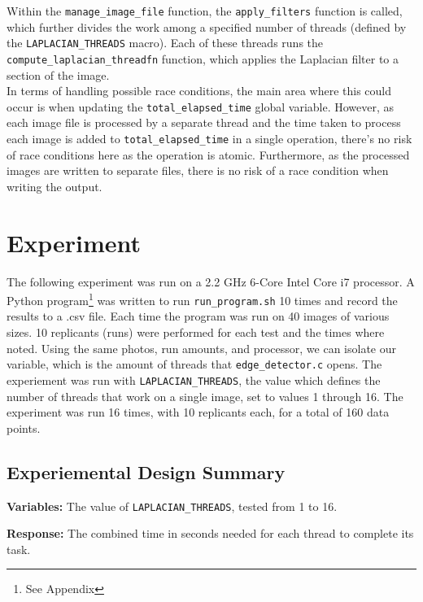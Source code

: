 \documentclass{article}
\begin{document}
Within the \texttt{manage\_image\_file} function,
the \texttt{apply\_filters} function is called,
which further divides the work among a specified number of threads
(defined by the \texttt{LAPLACIAN\_THREADS} macro).
Each of these threads runs the \texttt{compute\_laplacian\_threadfn} function,
which applies the Laplacian filter to a section of the image.\\

In terms of handling possible race conditions,
the main area where this could occur is when updating the \texttt{total\_elapsed\_time}
global variable. However, as each image file is processed
by a separate thread and the time taken to process each image is
added to \texttt{total\_elapsed\_time} in a single operation, there's no risk of
race conditions here as the operation is atomic.
Furthermore, as the processed images are written to separate files,
there is no risk of a race condition when writing the output.\\

\section*{Experiment}
The following experiment was run on a 2.2 GHz 6-Core Intel Core i7 processor.
A Python program\footnote{See Appendix} was written to run \texttt{run\_program.sh} 10 times and record the results to a .csv file.
Each time the program was run on 40 images of various sizes.
10 replicants (runs) were performed for each test and the times where noted.
Using the same photos, run amounts, and processor, we can isolate our variable, which is the amount of threads that \texttt{edge\_detector.c} opens.
The experiement was run with \texttt{LAPLACIAN\_THREADS}, the value which defines the number of threads that work on a single image, set to values 1 through 16.
The experiment was run 16 times, with 10 replicants each, for a total of 160 data points.

\subsection*{Experiemental Design Summary}
\begin{flushleft}
  \textbf{Variables:} The value of \texttt{LAPLACIAN\_THREADS}, tested from 1 to 16. \\
\end{flushleft}

\begin{flushleft}
  \textbf{Response:} The combined time in seconds needed for each thread to complete its task. \\
\end{flushleft}
\end{document}
